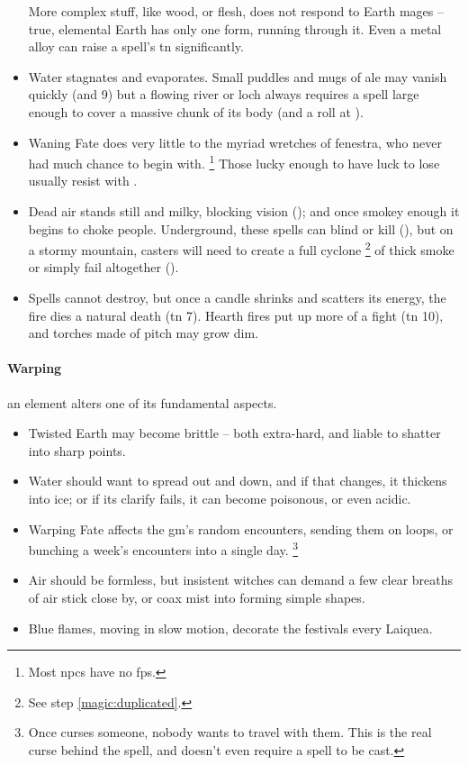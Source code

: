 \begin{multicols}{2}
\begin{itemize}
  More complex stuff, like wood, or flesh, does not respond to Earth mages -- true, elemental Earth has only one form, running through it.
  Even a metal alloy can raise a spell's \gls{tn} significantly.
  \item
  Water stagnates and evaporates.
  Small puddles and mugs of ale may vanish quickly (\tn[6] and 9)
  but a flowing river or loch always requires a spell large enough to cover a massive chunk of its body (and a roll at \tn[12]).
  \item
  Waning Fate does very little to the myriad wretches of \gls{fenestra}, who never had much chance to begin with.%
  \footnote{Most \glspl{npc} have no \glspl{fp}.}
  Those lucky enough to have luck to lose usually resist with .
  \item
  Dead air stands still and milky, blocking vision (\tn[7]);
  and once smokey enough it begins to choke people.
  Underground, these spells can blind or kill (\tn[9]), but on a stormy mountain, casters will need to create a full cyclone%
  \footnote{See step \vref{magic:duplicated}.}
  of thick smoke or simply fail altogether (\tn[16]).
  \item
  Spells cannot destroy, but once a candle shrinks and scatters its energy, the fire dies a natural death (\gls{tn} 7).
  Hearth fires put up more of a fight (\gls{tn} 10), and torches made of pitch may grow dim.
\end{itemize}

\paragraph{Warping}
an element alters one of its fundamental aspects.

\begin{itemize}
  \item
  Twisted Earth may become brittle -- both extra-hard, and liable to shatter into sharp points.
  \item
  Water should want to spread out and down, and if that changes, it thickens into ice;
  or if its clarify fails, it can become poisonous, or even acidic.
  \item
  Warping Fate affects the \gls{gm}'s random encounters, sending them on loops, or bunching a week's encounters into a single day.%
  \footnote{Once  curses someone, nobody wants to travel with them.  This is the real curse behind the spell, and doesn't even require a spell to be cast.}
  \item
  Air should be formless, but insistent witches can demand a few clear breaths of air stick close by, or coax mist into forming simple shapes.
  \item
  Blue flames, moving in slow motion, decorate the festivals every \gls{Laiquea}.
\end{itemize}


\end{multicols}
